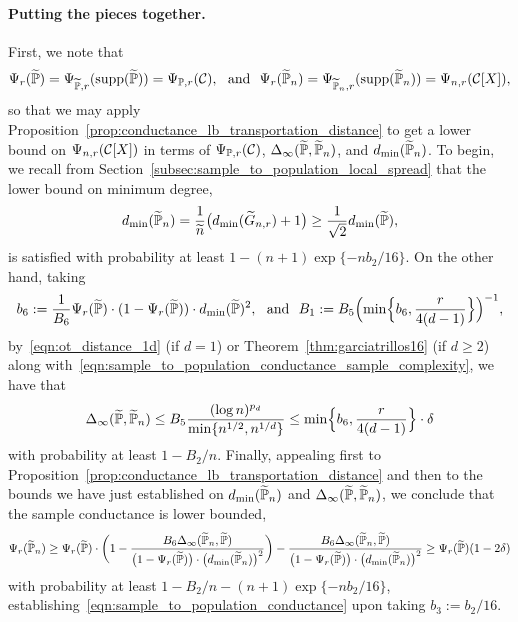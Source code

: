 \paragraph{Putting the pieces together.} 
First, we note that
\begin{equation*}
\Psi_r(\widetilde{\mathbb{P}}) = \Psi_{\widetilde{\mathbb{P}},r}(\mathrm{supp}(\widetilde{\mathbb{P}})) = \Psi_{\mathbb{P},r}(\mathcal{C}), ~~\textrm{and}~~\Psi_{r}(\widetilde{\mathbb{P}}_n) = \Psi_{\widetilde{\mathbb{P}}_n, r}(\mathrm{supp}(\widetilde{\mathbb{P}}_n)) = \Psi_{n,r}(\mathcal{C}[X]),
\end{equation*}
so that we may apply Proposition~\ref{prop:conductance_lb_transportation_distance} to get a lower bound on $\Psi_{n,r}(\mathcal{C}[X])$ in terms of $\Psi_{\mathbb{P},r}(\mathcal{C})$, $\Delta_{\infty}(\widetilde{\mathbb{P}}, \widetilde{\mathbb{P}}_n)$, and $d_{\min}(\widetilde{\mathbb{P}}_{n})$. To begin, we recall from Section~\ref{subsec:sample_to_population_local_spread} that the lower bound on minimum degree,
\begin{equation*}
d_{\min}(\widetilde{\mathbb{P}}_n) = \frac{1}{\widetilde{n}} \bigl(d_{\min}(\widetilde{G}_{n,r}) + 1\bigr) \geq \frac{1}{\sqrt{2}} d_{\min}(\widetilde{\mathbb{P}}),
\end{equation*}
is satisfied with probability at least $1 - (n + 1)\exp\{-nb_2/16\}$. On the other hand, taking
\begin{equation*}
b_6 := \frac{1}{B_6}\Psi_r(\widetilde{\mathbb{P}}) \cdot (1 - \Psi_r(\widetilde{\mathbb{P}})) \cdot d_{\min}(\widetilde{\mathbb{P}})^2,~~\textrm{and}~~ B_1 := B_5 \Bigl(\min\Bigl\{b_6, \frac{r}{4(d - 1)} \Bigr\}\Bigr)^{-1},
\end{equation*}
by~\eqref{eqn:ot_distance_1d} (if $d = 1$) or Theorem~\ref{thm:garciatrillos16} (if $d \geq 2$) along with~\eqref{eqn:sample_to_population_conductance_sample_complexity}, we have that
\begin{equation*}
\Delta_{\infty}(\widetilde{\mathbb{P}},\widetilde{\mathbb{P}}_n) \leq B_5 \frac{(\log n)^{p_d}}{\min\{n^{1/2},n^{1/d}\}} \leq \min\Bigl\{b_6, \frac{r}{4(d - 1)} \Bigr\} \cdot \delta
\end{equation*}
with probability at least $1 - B_2/n$. Finally, appealing first to  Proposition~\ref{prop:conductance_lb_transportation_distance} and then to the bounds we have just established on $d_{\min}(\widetilde{\mathbb{P}}_n)$ and $\Delta_{\infty}(\widetilde{\mathbb{P}},\widetilde{\mathbb{P}}_n)$, we conclude that the sample conductance is lower bounded,
\begin{equation*}
\Psi_r(\widetilde{\mathbb{P}}_n) \geq \Psi_r(\widetilde{\mathbb{P}}) \cdot \biggl(1 - \frac{B_6\Delta_{\infty}(\widetilde{\mathbb{P}}_n,\widetilde{\mathbb{P}})}{\bigl(1 - \Psi_r(\widetilde{\mathbb{P}})\bigr) \cdot \bigl(d_{\min}(\widetilde{\mathbb{P}}_n)\bigr)^2}\biggr) - \frac{B_6 \Delta_{\infty}(\widetilde{\mathbb{P}}_n,\widetilde{\mathbb{P}})}{\bigl(1 - \Psi_r(\widetilde{\mathbb{P}})\bigr) \cdot \bigl(d_{\min}(\widetilde{\mathbb{P}}_n)\bigr)^2} \geq \Psi_r(\widetilde{\mathbb{P}}) (1 - 2\delta)
\end{equation*}
with probability at least $1 - B_2/n - (n + 1)\exp\{-nb_2/16\}$, establishing~\eqref{eqn:sample_to_population_conductance} upon taking $b_3 := b_2/16$.

